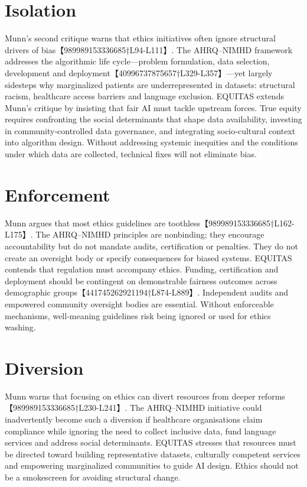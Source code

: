 \documentclass[11pt,twoside]{article}
\begin{document}
\section{Isolation}
Munn’s second critique warns that ethics initiatives often ignore structural drivers of bias【989989153336685†L94-L111】. The AHRQ–NIMHD framework addresses the algorithmic life cycle—problem formulation, data selection, development and deployment【40996737875657†L329-L357】—yet largely sidesteps why marginalized patients are underrepresented in datasets: structural racism, healthcare access barriers and language exclusion. EQUITAS extends Munn’s critique by insisting that fair AI must tackle upstream forces. True equity requires confronting the social determinants that shape data availability, investing in community‑controlled data governance, and integrating socio‑cultural context into algorithm design. Without addressing systemic inequities and the conditions under which data are collected, technical fixes will not eliminate bias.

\section{Enforcement}
Munn argues that most ethics guidelines are toothless【989989153336685†L162-L175】. The AHRQ–NIMHD principles are nonbinding; they encourage accountability but do not mandate audits, certification or penalties. They do not create an oversight body or specify consequences for biased systems. EQUITAS contends that regulation must accompany ethics. Funding, certification and deployment should be contingent on demonstrable fairness outcomes across demographic groups【441745262921194†L874-L889】. Independent audits and empowered community oversight bodies are essential. Without enforceable mechanisms, well‑meaning guidelines risk being ignored or used for ethics washing.

\section{Diversion}
Munn warns that focusing on ethics can divert resources from deeper reforms【989989153336685†L230-L241】. The AHRQ–NIMHD initiative could inadvertently become such a diversion if healthcare organisations claim compliance while ignoring the need to collect inclusive data, fund language services and address social determinants. EQUITAS stresses that resources must be directed toward building representative datasets, culturally competent services and empowering marginalized communities to guide AI design. Ethics should not be a smokescreen for avoiding structural change.
\end{document}
